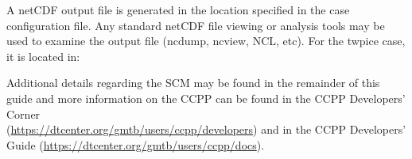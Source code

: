 A netCDF output file is generated in the location specified in the case
configuration file. Any standard netCDF file viewing or analysis tools may be used to 
examine the output file (ncdump, ncview, NCL, etc).  For the twpice case, it is located in:


Additional details regarding the SCM may be found in the remainder of this guide and more information on the CCPP can be found in the CCPP Developers' Corner\\ (\url{https://dtcenter.org/gmtb/users/ccpp/developers}) and in the CCPP Developers' Guide (\url{https://dtcenter.org/gmtb/users/ccpp/docs}).








